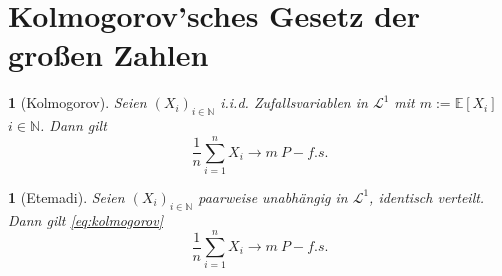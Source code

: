 \documentclass[10pt,a4paper]{report}
\numberwithin{equation}{section}
\numberwithin{figure}{section}
\theoremstyle{plain}
\theoremstyle{definition}
\theoremstyle{remark}
\theoremstyle{plain}
\newtheorem{prop}[thm]{\protect\propositionname}
\providecommand{\propositionname}{Satz}
\newcommand{\1}{ \mathbb{1} } %
\begin{document}
\section{Kolmogorov'sches Gesetz der großen Zahlen}
\begin{prop}[Kolmogorov]  %
  Seien $\left(X_{i}\right)_{i\in\mathbb{N}}$ i.i.d. Zufallsvariablen in $\mathcal{L}^{1}$
  mit $m:=\mathbb{E}\left[X_{i}\right]$ $i\in\mathbb{N}$. Dann gilt
  \begin{equation}
    \frac{1}{n}\sum_{i=1}^{n}X_{i}\to m\ P-f.s.\label{eq:kolmogorov}
  \end{equation}

\end{prop}

\begin{prop}[Etemadi] 

  Seien $\left(X_{i}\right)_{i\in\mathbb{N}}$ \emph{paarweise }unabhängig
  in $\mathcal{L}^{1}$, identisch verteilt. Dann gilt \ref{eq:kolmogorov}
  \[
  \frac{1}{n}\sum_{i=1}^{n}X_{i}\to m\ P-f.s.
  \]
\end{prop}
\end{document}
